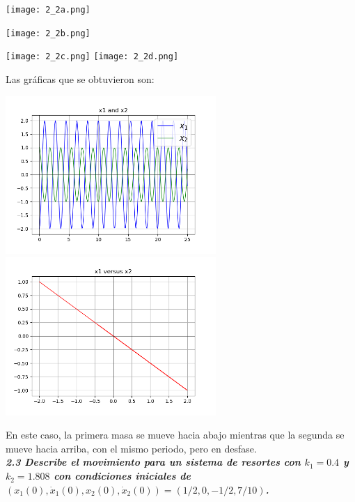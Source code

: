 \documentclass[12pt]{article}
\begin{document}
\begin{center}
    \texttt{[image: 2\_2a.png]}
\end{center}
\begin{center}
    \texttt{[image: 2\_2b.png]}
\end{center}
\begin{center}
    \texttt{[image: 2\_2c.png]}\hspace*{\fill}
    \texttt{[image: 2\_2d.png]}\\
\end{center}
Las gráficas que se obtuvieron son:
\begin{center}
    \includegraphics[height=6cm]{G2_2a.png}\hspace*{\fill}
    \includegraphics[height=6cm]{G2_2b.png}\\
\end{center}
En este caso, la primera masa se mueve hacia abajo mientras que la segunda se mueve hacia arriba, con el mismo periodo, pero en desfase.\\

\textbf{\textit{2.3 Describe el movimiento para un sistema de resortes con $k_1$$=0.4$ y $k_2$$=1.808$ con condiciones iniciales de $(x_1(0), \dot x_1(0), x_2(0), \dot x_2(0))=(1/2,0,-1/2,7/10)$.}}\\
\end{document}
